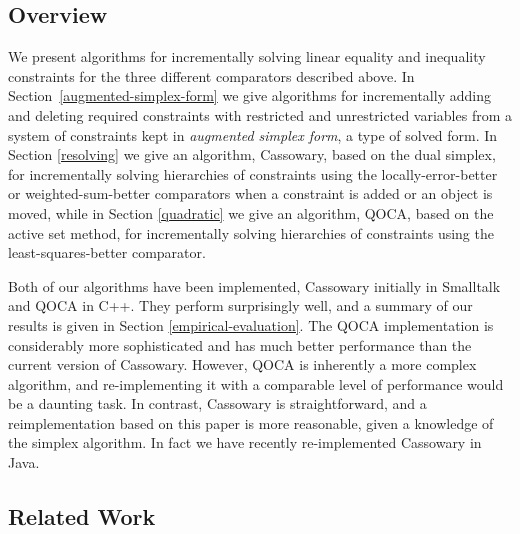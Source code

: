 \documentclass{article}
\begin{document}
\subsection{Overview}

We present algorithms for incrementally solving linear equality and
inequality constraints for the three different comparators described
above. In Section~\ref{augmented-simplex-form} we give algorithms for
incrementally adding and deleting required constraints with restricted and
unrestricted variables from a system of constraints kept in {\em augmented
simplex form}, a type of solved form.  In Section \ref{resolving} we give
an algorithm, Cassowary, based on the dual simplex, for incrementally
solving hierarchies of constraints using the locally-error-better or
weighted-sum-better comparators when a constraint is added or an object is
moved, while in Section \ref{quadratic} we give an algorithm, QOCA, based
on the active set method, for incrementally solving hierarchies of
constraints using the least-squares-better comparator.

Both of our algorithms have been implemented, Cassowary initially in
Smalltalk and QOCA in C++\@.  They perform surprisingly well, and a summary
of our results is given in Section \ref{empirical-evaluation}.  The QOCA
implementation is considerably more sophisticated and has much better
performance than the current version of Cassowary.  However, QOCA is
inherently a more complex algorithm, and re-implementing it with a
comparable level of performance would be a daunting task.  In contrast,
Cassowary is straightforward, and a reimplementation based on this paper is
more reasonable, given a knowledge of the simplex algorithm.  In fact we
have recently re-implemented Cassowary in Java.

\subsection{Related Work}
\end{document}
